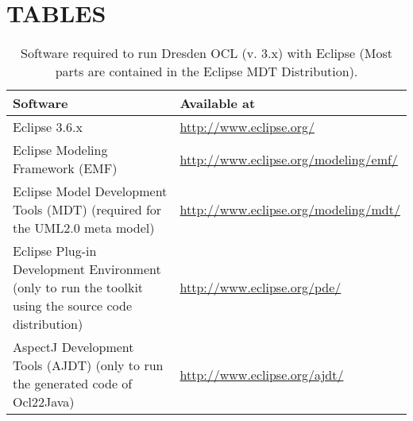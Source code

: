 \cleardoublepage
{}
{}
\chapter*{TABLES}

\begin{table}[h]
\begin{tabular}{|p{7cm}|p{7cm}|}
    \hline
    \textbf{Software} & \textbf{Available at} \\
    \hline
    Eclipse 3.6.x & \url{http://www.eclipse.org/} \\
    \hline
    Eclipse Modeling Framework (EMF) & \url{http://www.eclipse.org/modeling/emf/} \\
    \hline
    Eclipse Model Development Tools (MDT) 
    \newline\footnotesize(required for the UML2.0 meta model) &
    \url{http://www.eclipse.org/modeling/mdt/} \\
    \hline
    Eclipse Plug-in Development Environment 
    \newline\footnotesize(only to run the toolkit using the source code
    distribution) & \url{http://www.eclipse.org/pde/} \\
    \hline
    AspectJ Development Tools (AJDT) 
    \newline\footnotesize(only to run the generated code of Ocl22Java) &
    \url{http://www.eclipse.org/ajdt/} \\
    \hline
\end{tabular}
\caption{Software required to run Dresden OCL (v. 3.x) with Eclipse \newline(Most parts are con\-tained in the Eclipse MDT Distribution).}
\label{tab:software}
\end{table}



